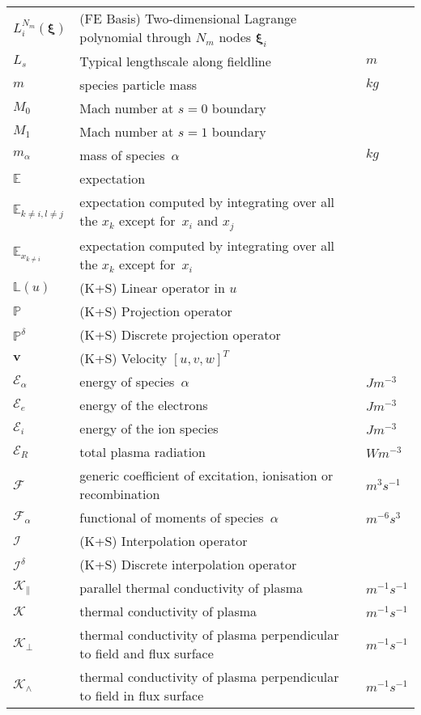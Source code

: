 \begin{longtable}{|p{3.0cm}|p{10.0cm}|p{3.0cm}|}
$L_i^{N_m}(\boldsymbol{\xi})$ &  (FE Basis) Two-dimensional Lagrange polynomial through $N_m$ nodes ${\mathbf \xi}_i$ & \\
$L_s$ & Typical lengthscale along fieldline  & $m$ \\
$m$ & species particle mass & $kg$ \\
$M_0$ & Mach number at $s=0$ boundary & \\
$M_1$ & Mach number at $s=1$ boundary & \\
$m_\alpha$ & mass of species~$\alpha$ & $kg$ \\
$\mathbb{E}$ & expectation  & \\
$\mathbb{E}_{k\neq i, l\neq j}$ & expectation computed by integrating over all the $x_k$ except for~$x_i$ and  $x_j$  & \\
$\mathbb{E}_{x_{k\neq i}}$ & expectation computed by integrating over all the $x_k$ except for~$x_i$  & \\
$\mathbb{L}(u)$ &  (K+S) Linear operator in $u$ & \\
$\mathbb{P}$ &  (K+S) Projection operator & \\
$\mathbb{P}^{\delta}$ &  (K+S) Discrete projection operator & \\
${\mathbf v}$ &  (K+S) Velocity $[u, v, w]^T$ & \\
$\mathcal{E}_\alpha$ & energy of species~$\alpha$ & $J m^{-3}$ \\
$\mathcal{E}_e$ & energy of the electrons & $J m^{-3}$ \\
$\mathcal{E}_i$ & energy of the ion species & $J m^{-3}$ \\
$\mathcal{E}_R$ & total plasma radiation & $W m^{-3}$ \\
$\mathcal{F}$ & generic coefficient of excitation, ionisation or recombination  & $m^3 s^{-1}$ \\
$\mathcal{F}_\alpha$ & functional of moments of species~$\alpha$  & $m^{-6} s^3$ \\
$\mathcal{I}$ &  (K+S) Interpolation operator & \\
$\mathcal{I}^{\delta}$ &  (K+S) Discrete interpolation operator & \\
$\mathcal{K}_{\|}$ & parallel thermal conductivity of plasma & $m^{-1}s^{-1}$ \\
$\mathcal{K}$ & thermal conductivity of plasma & $m^{-1}s^{-1}$ \\
$\mathcal{K}_{\perp}$ & thermal conductivity of plasma perpendicular to field and flux surface & $m^{-1}s^{-1}$ \\
$\mathcal{K}_{\wedge}$ & thermal conductivity of plasma perpendicular to field in flux surface & $m^{-1}s^{-1}$ \\

\end{longtable}
